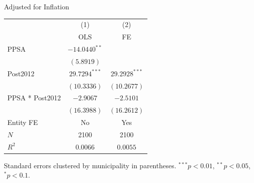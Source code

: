 \documentclass[border=10pt,varwidth=25cm]{standalone}
\renewenvironment{table}[1][]{}{}
\begin{document}
\begin{table}[H]
    \centering
    \scriptsize
    \begin{minipage}{\textwidth}
    \centering
    {\normalsize Adjusted for Inflation}
    \vspace{6pt}
    \begin{tabular}{lcc}
        \toprule
         & (1) & (2) \\
         & OLS & FE \\
        \midrule
        PPSA & $-14.0440^{**}$ &  \\
         & $(5.8919)$ &  \\[4pt]
        Post2012 & $29.7294^{***}$ & $29.2928^{***}$ \\
         & $(10.3336)$ & $(10.2677)$ \\[4pt]
        PPSA * Post2012 & $-2.9067$ & $-2.5101$ \\
         & $(16.3988)$ & $(16.2612)$ \\[4pt]
        \midrule
        Entity FE & No & Yes \\
        $N$ & 2100 & 2100 \\
        $R^2$ & $0.0066$ & $0.0055$ \\
        \bottomrule
    \end{tabular}

    \vspace{6pt}
    {\scriptsize Standard errors clustered by municipality in parentheses. $^{***}p<0.01$, $^{**}p<0.05$, $^{*}p<0.1$.}
    \end{minipage}
\end{table}
\end{document}

